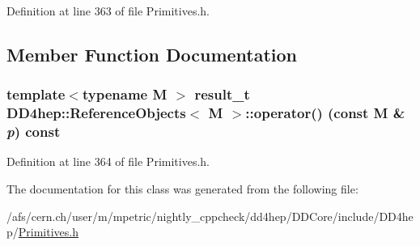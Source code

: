 Definition at line 363 of file Primitives.h.

\subsection{Member Function Documentation}
\hypertarget{class_d_d4hep_1_1_reference_objects_a286d5f305ade999bc0c55274d5937944}{
\subsubsection[{operator()}]{\setlength{\rightskip}{0pt plus 5cm}template$<$typename M $>$ {\bf result\_\-t} {\bf DD4hep::ReferenceObjects}$<$ M $>$::operator() (const M \& {\em p}) const}}
\label{class_d_d4hep_1_1_reference_objects_a286d5f305ade999bc0c55274d5937944}


Definition at line 364 of file Primitives.h.

The documentation for this class was generated from the following file:\begin{DoxyCompactItemize}
\item 
/afs/cern.ch/user/m/mpetric/nightly\_\-cppcheck/dd4hep/DDCore/include/DD4hep/\hyperlink{_primitives_8h}{Primitives.h}\end{DoxyCompactItemize}
